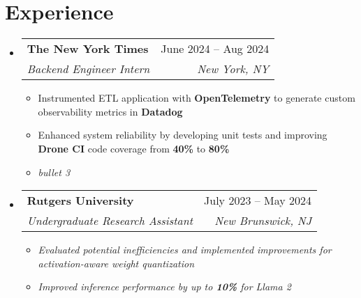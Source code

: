\documentclass[letterpaper,11pt]{article}
\makeatletter
\newcommand{\resumeItem}[1]{
  \item\small{
    {#1 \vspace{-2pt}}
  }
}
\newcommand{\resumeSubheading}[4]{
  \vspace{-2pt}\item
    \begin{tabular*}{0.97\textwidth}[t]{l@{\extracolsep{\fill}}r}
      \textbf{#1} & #2 \\
      \textit{\small#3} & \textit{\small #4} \\
    \end{tabular*}\vspace{-7pt}
}
\newcommand{\resumeSubHeadingListStart}{\begin{itemize}[leftmargin=0.15in, label={}]}
\newcommand{\resumeSubHeadingListEnd}{\end{itemize}}
\newcommand{\resumeItemListStart}{\begin{itemize}}
\newcommand{\resumeItemListEnd}{\end{itemize}\vspace{-3pt}}
\makeatother
\begin{document}
\section{Experience}
  \resumeSubHeadingListStart
    \resumeSubheading
      {The New York Times}{June 2024 -- Aug 2024}
      {Backend Engineer Intern}{New York, NY}
      \resumeItemListStart
        \resumeItem{Instrumented ETL application with \textbf{OpenTelemetry} to generate custom observability metrics in \textbf{Datadog}}
        \resumeItem{Enhanced system reliability by developing unit tests and improving \textbf{Drone CI} code coverage from \textbf{40\%} to \textbf{80\%}}
        \resumeItem{\textit{bullet 3}}
      \resumeItemListEnd
    \resumeSubheading
      {Rutgers University}{July 2023 -- May 2024}
      {Undergraduate Research Assistant}{New Brunswick, NJ}
      \resumeItemListStart
        \resumeItem{\textit{Evaluated potential inefficiencies and implemented improvements for activation-aware weight quantization}}
        \resumeItem{\textit{Improved inference performance by up to \textbf{10\%} for Llama 2}}
      \resumeItemListEnd
  \resumeSubHeadingListEnd


\end{document}
